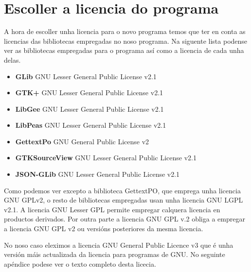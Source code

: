 \chapter{Escoller a licencia do programa}

A hora de escoller unha licencia para o novo programa temos que ter en conta as licencias das bibliotecas empregadas no noso programa. Na siguente lista podense ver as bibliotecas empregadas para o programa así como a licencia de cada unha delas.

\begin{itemize}
  \item \textbf{GLib} GNU Lesser General Public License v2.1
  \item \textbf{GTK+} GNU Lesser General Public License v2.1
  \item \textbf{LibGee}  GNU Lesser General Public License v2.1
  \item \textbf{LibPeas} GNU Lesser General Public License v2.1
  \item \textbf{GettextPo} GNU General Public License v2
  \item \textbf{GTKSourceView} GNU Lesser General Public License v2.1
  \item \textbf{JSON-GLib} GNU Lesser General Public License v2.1
\end{itemize}

Como podemos ver excepto a biblioteca GettextPO, que emprega unha licencia GNU GPLv2, o resto de bibliotecas empregadas usan unha licencia GNU LGPL v2.1. A licencia GNU Lesser GPL permite empregar calquera licencia en productos derivados. Por outra parte a licencia GNU GPL v.2 obliga a empregar a licencia GNU GPL v2 ou versións posteriores da mesma licencia.

No noso caso eleximos a licencia GNU General Public Licence v3 que é unha versión máis actualizada da licencia para programas de GNU. No seguinte apéndice podese ver o texto completo desta licecia.

